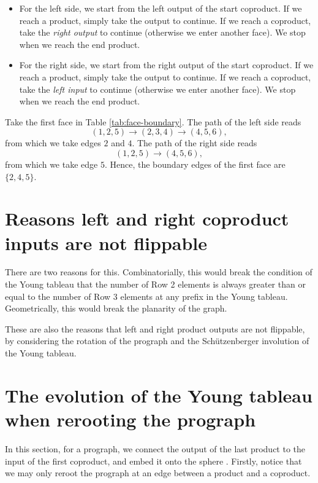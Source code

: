 \begin{itemize}
  \item For the left side, we start from the left output of the start coproduct. If we reach a product, simply take the output to continue. If we reach a coproduct, take the \textit{right output} to continue (otherwise we enter another face). We stop when we reach the end product.
  \item For the right side, we start from the right output of the start coproduct. If we reach a product, simply take the output to continue. If we reach a coproduct, take the \textit{left input} to continue (otherwise we enter another face). We stop when we reach the end product.
\end{itemize}

\begin{example}
  Take the first face in Table \ref{tab:face-boundary}. The path of the left side reads
  $$(1,2,5)\rightarrow (2,3,4) \rightarrow (4,5,6),$$
  from which we take edges $2$ and $4$. The path of the right side reads
  $$(1,2,5) \rightarrow (4,5,6),$$
  from which we take edge $5$. Hence, the boundary edges of the first face are $\{2,4,5\}$.
\end{example}

\section{Reasons left and right coproduct inputs are not flippable}

There are two reasons for this. Combinatorially, this would break the condition of the Young tableau that the number of Row 2 elements is always greater than or equal to the number of Row 3 elements at any prefix in the Young tableau. Geometrically, this would break the planarity of the graph.

These are also the reasons that left and right product outputs are not flippable, by considering the rotation of the prograph and the Schützenberger involution of the Young tableau.

\section{The evolution of the Young tableau when rerooting the prograph}

In this section, for a prograph, we connect the output of the last product to the input of the first coproduct, and embed it onto the sphere \cite{borie2022product}. Firstly, notice that we may only reroot the prograph at an edge between a product and a coproduct.

